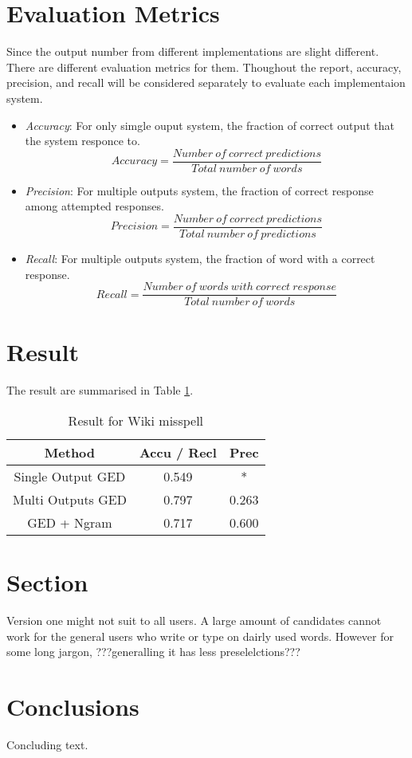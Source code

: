 \documentclass[11pt]{article}
\begin{document}
\section{Evaluation Metrics}
Since the output number from different implementations are slight different. There are different evaluation metrics for them. Thoughout the report, accuracy, precision, and recall will be considered separately to evaluate each implementaion system.
\begin{itemize}
\item \emph{Accuracy}: For only simgle ouput system, the fraction of correct output that the system responce to.
\[Accuracy = \frac{Number\ of\ correct\ predictions}{Total\ number\ of\ words}\]
\item \emph{Precision}: For multiple outputs system, the fraction of correct response among attempted responses.
\[Precision = \frac{Number\ of\ correct\ predictions}{Total\ number\ of\ predictions}\]
\item \emph{Recall}: For multiple outputs system, the fraction of word with a correct response.
\[Recall = \frac{Number\ of\ words\ with\ correct\ response}{Total\ number\ of\ words}\]
\end{itemize}

\section{Result}
The result are summarised in Table \ref{table1}.

\begin{table}[h]
 \begin{center}
\begin{tabular}{|c|c|c|}

      \hline
      Method & Accu / Recl & Prec\\
      \hline
      
      Single Output GED & 0.549 & *\\
	 \hline      
      Multi Outputs GED & 0.797 & 0.263\\
      \hline 
      GED + Ngram & 0.717 & 0.600\\
      \hline
\end{tabular}
\caption{Result for Wiki misspell}\label{table1}
 \end{center}
\end{table}



\section{Section}
Version one might not suit to all users. A large amount of candidates cannot work for the general users who write or type on dairly used words. However for some long jargon, ???generalling it has less preselelctions???
\section{Conclusions}

Concluding text.



\end{document}

